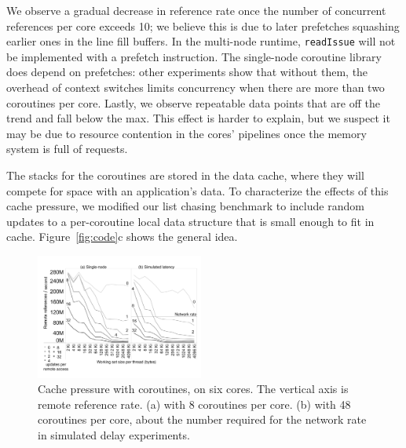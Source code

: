 \documentclass[10pt,nocopyrightspace,preprint]{sigplanconf}
\begin{document}
We observe a gradual decrease in reference rate once the number of
concurrent references per core exceeds 10; we believe this is due to
later prefetches squashing earlier ones in the line fill buffers. In the multi-node runtime, \texttt{readIssue} will not be implemented with a prefetch instruction. The single-node coroutine library does depend on prefetches: other experiments show that without them, the overhead of context switches limits concurrency when there are more than two coroutines per core. Lastly, we observe repeatable data points that are off the trend and fall below the max. This effect is harder to explain, but we suspect it may be
due to resource contention in the cores' pipelines once the memory
system is full of requests. 



The stacks for the coroutines are stored in the data cache, where they
will compete for space with an application's data. To characterize the
effects of this cache pressure, we modified our list chasing benchmark
to include random updates to a per-coroutine local data structure that
is small enough to fit in cache. Figure~\ref{fig:code}c shows the
general idea.

\begin{figure}[h]
  \begin{center}
    \includegraphics[width=0.49\textwidth]{figures/cachepressurenewview-edited.pdf}
  \end{center}
  \vspace{0.0in}
  \caption{Cache pressure with coroutines, on six cores. The vertical axis is remote reference rate. (a) with 8 coroutines per core. (b) with 48 coroutines per core, about the number required for the network rate in simulated delay experiments. }
  \label{fig:cache-pressure}
\end{figure}
\end{document}
